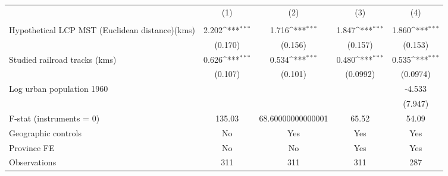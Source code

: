 {
\def\sym#1{\ifmmode^{#1}\else\(^{#1}\)\fi}
\begin{tabular}{l*{4}{c}}
\hline\hline
                &\multicolumn{1}{c}{(1)}&\multicolumn{1}{c}{(2)}&\multicolumn{1}{c}{(3)}&\multicolumn{1}{c}{(4)}\\
                &\multicolumn{1}{c}{}&\multicolumn{1}{c}{}&\multicolumn{1}{c}{}&\multicolumn{1}{c}{}\\
\hline
Hypothetical LCP MST (Euclidean distance)(kms)&    2.202\sym{***}&    1.716\sym{***}&    1.847\sym{***}&    1.860\sym{***}\\
                &  (0.170)         &  (0.156)         &  (0.157)         &  (0.153)         \\
[1em]
Studied railroad tracks (kms)&    0.626\sym{***}&    0.534\sym{***}&    0.480\sym{***}&    0.535\sym{***}\\
                &  (0.107)         &  (0.101)         & (0.0992)         & (0.0974)         \\
[1em]
Log urban population 1960&                  &                  &                  &   -4.533         \\
                &                  &                  &                  &  (7.947)         \\
\hline
F-stat (instruments = 0)&   135.03         &68.60000000000001         &    65.52         &    54.09         \\
Geographic controls&       No         &      Yes         &      Yes         &      Yes         \\
Province FE     &       No         &       No         &      Yes         &      Yes         \\
Observations    &      311         &      311         &      311         &      287         \\
\hline\hline
\end{tabular}
}
